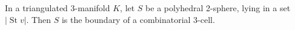 In a triangulated 3-manifold $K$, let $S$ be a polyhedral 2-sphere, lying in a set $|\operatorname{St} v|$. Then $S$ is the boundary of a combinatorial 3-cell.
